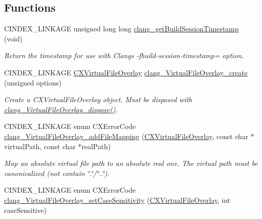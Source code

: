 \subsection*{Functions}
\begin{DoxyCompactItemize}
\item 
\mbox{\label{group__BUILD__SYSTEM_ga49c44b2501c98768d29ad84fdaa3f8f0}} 
C\+I\+N\+D\+E\+X\+\_\+\+L\+I\+N\+K\+A\+GE unsigned long long \hyperlink{group__BUILD__SYSTEM_ga49c44b2501c98768d29ad84fdaa3f8f0}{clang\+\_\+get\+Build\+Session\+Timestamp} (void)
\begin{DoxyCompactList}\small\item\em Return the timestamp for use with Clang\textquotesingle{}s {\ttfamily -\/fbuild-\/session-\/timestamp=} option. \end{DoxyCompactList}\item 
C\+I\+N\+D\+E\+X\+\_\+\+L\+I\+N\+K\+A\+GE \hyperlink{group__BUILD__SYSTEM_gae854e36ceb0a02071e557e19f908772d}{C\+X\+Virtual\+File\+Overlay} \hyperlink{group__BUILD__SYSTEM_gac0fc5753287609c4087155c3bab1ba1b}{clang\+\_\+\+Virtual\+File\+Overlay\+\_\+create} (unsigned options)
\begin{DoxyCompactList}\small\item\em Create a {\ttfamily C\+X\+Virtual\+File\+Overlay} object. Must be disposed with {\ttfamily \hyperlink{group__BUILD__SYSTEM_ga118f45b2f96f989fc1f39f3f95973deb}{clang\+\_\+\+Virtual\+File\+Overlay\+\_\+dispose()}}. \end{DoxyCompactList}\item 
C\+I\+N\+D\+E\+X\+\_\+\+L\+I\+N\+K\+A\+GE enum C\+X\+Error\+Code \hyperlink{group__BUILD__SYSTEM_gab5570468498c950cc25f2746765a9cd7}{clang\+\_\+\+Virtual\+File\+Overlay\+\_\+add\+File\+Mapping} (\hyperlink{group__BUILD__SYSTEM_gae854e36ceb0a02071e557e19f908772d}{C\+X\+Virtual\+File\+Overlay}, const char $\ast$virtual\+Path, const char $\ast$real\+Path)
\begin{DoxyCompactList}\small\item\em Map an absolute virtual file path to an absolute real one. The virtual path must be canonicalized (not contain \char`\"{}.\char`\"{}/\char`\"{}..\char`\"{}). \end{DoxyCompactList}\item 
C\+I\+N\+D\+E\+X\+\_\+\+L\+I\+N\+K\+A\+GE enum C\+X\+Error\+Code \hyperlink{group__BUILD__SYSTEM_ga00ca3247ef5f5e3ac504ce13623939e3}{clang\+\_\+\+Virtual\+File\+Overlay\+\_\+set\+Case\+Sensitivity} (\hyperlink{group__BUILD__SYSTEM_gae854e36ceb0a02071e557e19f908772d}{C\+X\+Virtual\+File\+Overlay}, int case\+Sensitive)

\end{DoxyCompactItemize}

